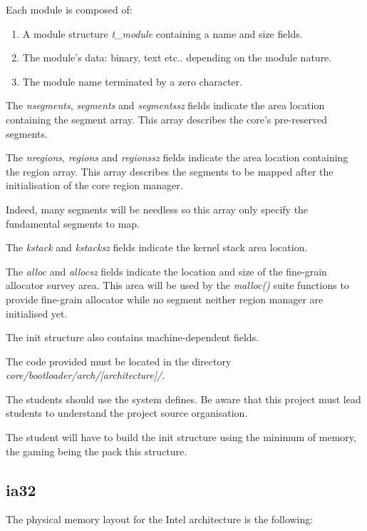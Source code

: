 Each module is composed of:

\begin{enumerate}
  \item
    A module structure \textit{t\_module} containing a name and size fields.
  \item
    The module's data: binary, text etc.. depending on the module nature.
  \item
    The module name terminated by a zero character.
\end{enumerate}

The \textit{nsegments}, \textit{segments} and \textit{segmentssz} fields
indicate the area location containing the segment array. This array
describes the core's pre-reserved segments.

The \textit{nregions}, \textit{regions} and \textit{regionssz} fields
indicate the area location containing the region array. This array
describes the segments to be mapped after the initialisation of the
core region manager.

Indeed, many segments will be needless so this array only specify the
fundamental segments to map.

The \textit{kstack} and \textit{kstacksz} fields indicate the kernel
stack area location.

The \textit{alloc} and \textit{allocsz} fields indicate the location
and size of the fine-grain allocator survey area. This area will be
used by the \textit{malloc()} suite functions to provide fine-grain
allocator while no segment neither region manager are initialised yet.

The init structure also contains machine-dependent fields.

The code provided must be located in the directory
\textit{core/bootloader/arch/[architecture]/}.

The students should use the system defines. Be aware that this project
must lead students to understand the project source organisation.

The student will have to build the init structure using the minimum
of memory, the gaming being the pack this structure.

%
%

\subsection{ia32}

The physical memory layout for the Intel architecture is the following:

